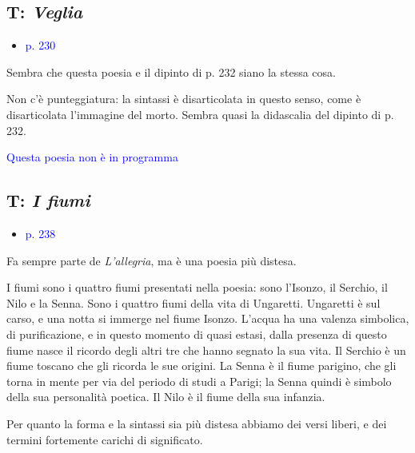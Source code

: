 \documentclass[a4paper, twoside, titlepage]{book}
\newcommand{\elenco}[1]{%
\begin{itemize}
#1
\end{itemize}}
\renewcommand{\emph}[1]{\textcolor{blue}{#1}}
\begin{document}
\subsection{T: \textit{Veglia}}
\elenco{\item \emph{p. 230}}

Sembra che questa poesia e il dipinto di p. 232 siano la stessa cosa.

Non c'è punteggiatura: la sintassi è disarticolata in questo senso, come è disarticolata l'immagine del morto. Sembra quasi la didascalia del dipinto di p. 232.

\emph{Questa poesia non è in programma}

\subsection{T: \textit{I fiumi}}
\elenco{\item \emph{p. 238}}

Fa sempre parte de \textit{L'allegria}, ma è una poesia più distesa.

I fiumi sono i quattro fiumi presentati nella poesia: sono l'Isonzo, il Serchio, il Nilo e la Senna. Sono i quattro fiumi della vita di Ungaretti.
Ungaretti è sul carso, e una notta si immerge nel fiume Isonzo. L'acqua ha una valenza simbolica, di purificazione, e in questo momento di quasi estasi, dalla presenza di questo fiume nasce il ricordo degli altri tre che hanno segnato la sua vita.
Il Serchio è un fiume toscano che gli ricorda le sue origini. La Senna è il fiume parigino, che gli torna in mente per via del periodo di studi a Parigi; la Senna quindi è simbolo della sua personalità poetica. Il Nilo è il fiume della sua infanzia.

Per quanto la forma e la sintassi sia più distesa abbiamo dei versi liberi, e dei termini fortemente carichi di significato.
\end{document}

